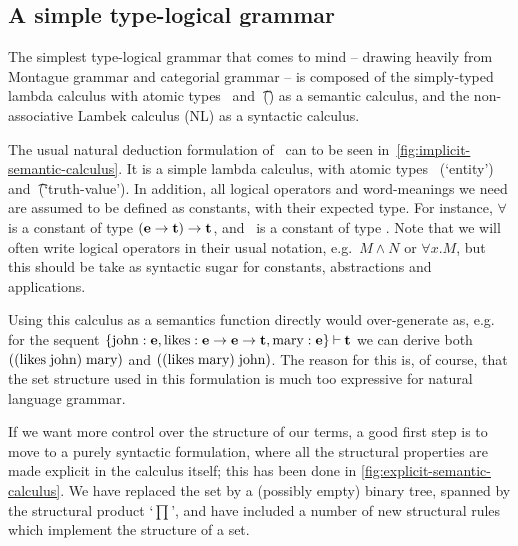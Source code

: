 \documentclass[a4paper]{article}
\begin{document}
\subsection{A simple type-logical grammar}\label{sec:simple-type-logical-grammar}
The simplest type-logical grammar that comes to mind -- drawing
heavily from Montague grammar and categorial grammar -- is composed of
the simply-typed lambda calculus with atomic types \e\ and \t\ (\lamET) as
a semantic calculus, and the non-associative Lambek calculus (NL) as a
syntactic calculus.

The usual natural deduction formulation of \lamET\ can to be seen
in~\autoref{fig:implicit-semantic-calculus}. It is a simple lambda
calculus, with atomic types \e\ (`entity') and \t\ (`truth-value'). In
addition, all logical operators and word-meanings we need are assumed
to be defined as constants, with their expected type. For instance,
$\forall$ is a constant of type $(\mathbf{e}\rightarrow\mathbf{t})\rightarrow\mathbf{t}$, and \john\ is a
constant of type \e. Note that we will often write logical operators
in their usual notation, e.g.\ $M\land N$ or $\forall x.M$, but this
should be take as syntactic sugar for constants, abstractions and
applications.

%

Using this calculus as a semantics function directly would
over-generate as, e.g. for the sequent $\{\text{john}:\mathbf{e},
\text{likes}:\mathbf{e}\rightarrow\mathbf{e}\rightarrow\mathbf{t}, \text{mary}:\mathbf{e}\}\mathbin{\vdash}\mathbf{t}$ we can derive
both $((\text{likes}\;\text{john})\;\text{mary})$ and $((\text{likes}\;\text{mary})\;\text{john})$.
The reason for this is, of course, that the set structure used in this
formulation is much too expressive for natural language grammar.

If we want more control over the structure of our terms, a good first
step is to move to a purely syntactic formulation, where all the
structural properties are made explicit in the calculus itself; this
has been done in \autoref{fig:explicit-semantic-calculus}. We have
replaced the set by a (possibly empty) binary tree, spanned by the
structural product `$\prod$', and have included a number of new
structural rules which implement the structure of a set.
\end{document}
